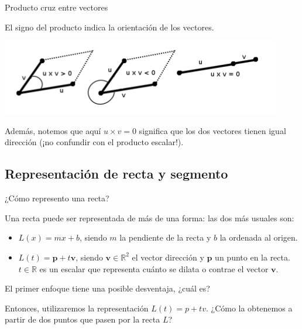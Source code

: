 \documentclass[compress]{beamer}
\newcommand{\bigpause}{\bigskip \pause}
\begin{document}
\begin{frame}{Producto cruz entre vectores}

El signo del producto indica la orientaci\'on de los vectores.
%
\begin{center}
\includegraphics[scale=0.6]{images/producto_cruz.png}
\end{center}
%

Adem\'as, notemos que aqu\'i $u \times v = 0$ significa que los dos vectores tienen igual direcci\'on (¡no confundir con el producto escalar!). \\

\end{frame}

\subsection{Representaci\'on de recta y segmento}
\begin{frame}{¿C\'omo represento una recta?}

Una recta puede ser representada de m\'as de una forma: las dos m\'as usuales son:

\begin{itemize}
\item $L(x) = m x + b$, siendo $m$ la pendiente de la recta y $b$ la ordenada al origen.
\item $L(t) = \mathbf{p} + t \mathbf{v}$, siendo $\mathbf{v} \in \mathbb{R}^2$ el vector direcci\'on y 
$\mathbf{p}$ un punto en la recta. $t \in \mathbb{R}$ es un escalar que representa cu\'anto se dilata o contrae el vector $\mathbf{v}$.
\end{itemize}

El primer enfoque tiene una posible desventaja, ¿cu\'al es?

\bigpause
{}
\end{frame}

\begin{frame}

Entonces, utilizaremos la representaci\'on $L(t) = p + t v$. ¿C\'omo la obtenemos a partir de dos puntos que pasen por la recta $L$?

\bigpause
{}
\end{frame}
\end{document}
